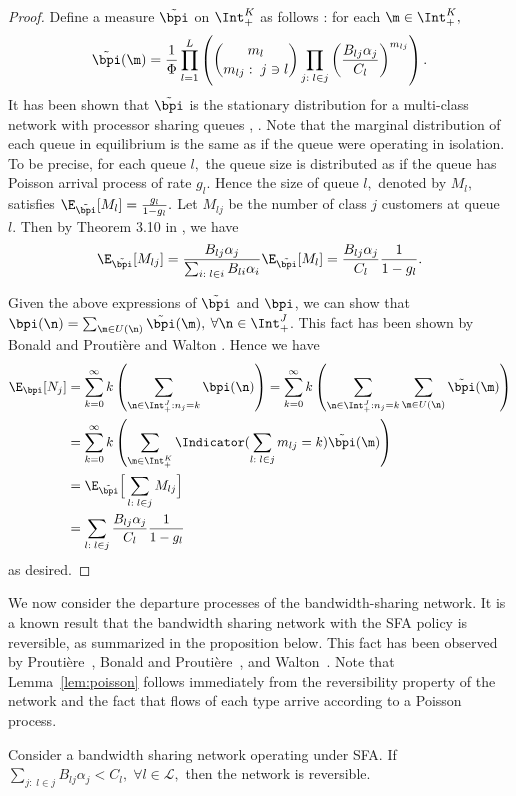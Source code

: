 \begin{proof}
	Define a measure $\tilde{\bpi}$ on $\Int_{+}^{K}$ as follows \cite[ Proposition 4.2 ]{shah2014SFA}:
	for each $\m\in\Int_{+}^{K},$
	\[
	\tilde{\bpi}(\m)=\frac{1}{\Phi}\prod_{l=1}^{L}\left({m_{l} \choose m_{lj}:\;j\ni l}\prod_{j:\;l\in j}\left(\frac{B_{lj}\alpha_{j}}{C_{l}}\right)^{m_{lj}}\right).
	\]
	It has been shown that $\tilde{\bpi}$ is the stationary distribution
	for a multi-class network with processor sharing queues \cite[Proposition 1]{kelly2009resource}, \cite[Proposition 2.1]{walton2009fairness}.
	Note that the marginal distribution of each queue in equilibrium is
	the same as if the queue were operating in isolation. To be precise,
	for each queue $l,$ the queue size is distributed as if the queue has Poisson
	arrival process of rate $g_{l}.$ Hence the size of queue $l,$ denoted
	by $M_{l},$ satisfies $\E_{\tilde{\bpi}}[M_{l}]=\frac{g_{l}}{1-g_{l}}.$ Let $M_{lj}$
	be the number of class $j$ customers at queue $l.$ Then by Theorem
	3.10 in \cite{kelly1979reversibility}, we have
	\begin{equation}
	\E_{\tilde{\bpi}}[M_{lj}]=\frac{B_{lj}\alpha_{j}}{\sum_{i:\;l\in i}B_{li}\alpha_{i}}\E_{\tilde{\bpi}}[M_{l}]=\frac{B_{lj}\alpha_{j}}{C_{l}}\frac{1}{1-g_{l}}.\label{eq:Exp_Mlj}
	\end{equation}
	
	
	Given the above expressions of $\tilde{\bpi}$ and $\bpi$, we can show that $\bpi(\n)=\sum_{\m\in U(\n)}\tilde{\bpi}(\m),$ $\forall\n\in\Int_{+}^{J}$.
	This fact has been shown by Bonald and Prouti\`{e}re \cite{bonald2004performance}
	and Walton \cite{walton2009fairness}. Hence we have 
	\begin{align*}
	\E_{\bpi}[N_{j}] & =\sum_{k=0}^{\infty}k\left(\sum_{\n\in\Int_{+}^{J}:n_{j}=k}\bpi(\n)\right)=\sum_{k=0}^{\infty}k\left(\sum_{\n\in\Int_{+}^{J}:n_{j}=k}\sum_{\m\in U(\n)}\tilde{\bpi}(\m)\right)\\
	& =\sum_{k=0}^{\infty}k\left(\sum_{\m\in\Int_{+}^{K}}\Indicator(\sum_{l:\;l\in j}m_{lj}=k)\tilde{\bpi}(\m)\right)\\
	& =\E_{\tilde{\bpi}} \Big[ \sum_{l:\;l\in j}M_{lj} \Big] \\
	& =\sum_{l:\;l\in j}\frac{B_{lj}\alpha_{j}}{C_{l}}\frac{1}{1-g_{l}}
	\end{align*}
	as desired.
\end{proof}

We now consider the departure processes of the bandwidth-sharing network. It is a known result that the bandwidth sharing network with the SFA policy is reversible, as summarized in the proposition below. This fact has been observed by Prouti\`{e}re~\cite{proutiere_thesis}, 
Bonald and Prouti\`{e}re~\cite{bonald2004performance}, and Walton~\cite{walton2009fairness}. 
Note that Lemma~\ref{lem:poisson} follows immediately from the reversibility property of the network and the fact that flows of each type arrive according to a Poisson process.
\begin{prop} \label{prop:reversibility} 
Consider a bandwidth sharing network operating under SFA. If $\sum_{j:\;l\in j}B_{lj}\alpha_{j}<C_{l},\;\forall l\in\mathcal{L},$ then the network is reversible.
\end{prop}



